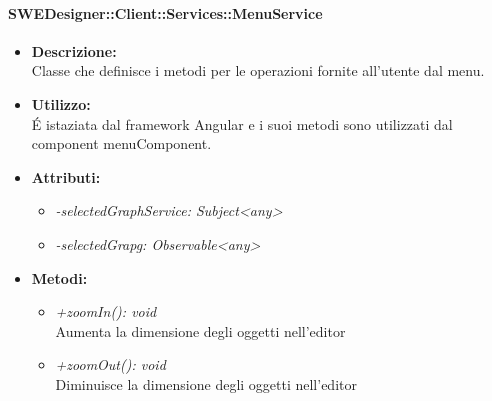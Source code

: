 			\paragraph{SWEDesigner::Client::Services::MenuService}
				\begin{itemize}
          			\item \textbf{Descrizione:}\\
          			Classe che definisce i metodi per le operazioni fornite all’utente dal menu.
          			\item \textbf{Utilizzo:}\\
          			É istaziata dal framework Angular e i suoi metodi sono utilizzati dal component menuComponent.
          			\item \textbf{Attributi:}\\
          			\begin{itemize}
          				\item \emph{-selectedGraphService: Subject<any>}\\
          				\item \emph{-selectedGrapg: Observable<any>}\\
          			\end{itemize}
          			\item \textbf{Metodi:}\\
          			\begin{itemize}
          				\item \emph{+zoomIn(): void}\\
          				Aumenta la dimensione degli oggetti nell'editor
          				\item \emph{+zoomOut(): void}\\
          				Diminuisce la dimensione degli oggetti nell'editor
          			\end{itemize}
          		\end{itemize}
